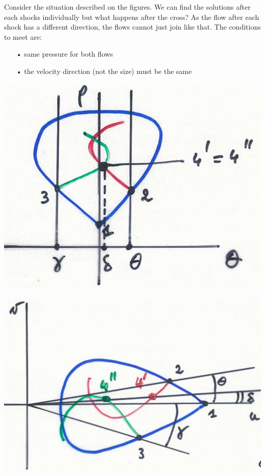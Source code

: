 Consider the situation described on the figures. We can find the solutions after each shocks individually but what happens after the cross? As the flow after each shock has a different direction, the flows cannot just join like that. The conditions to meet are:\\

\begin{itemize}
\item[•] same pressure for both flows
\item[•] the velocity direction (not the size) must be the same\\
\end{itemize}

\begin{center}
\begin{minipage}{0.33\textwidth}
\includegraphics[scale=0.25]{ch9/10}
\end{minipage}
\begin{minipage}{0.35\textwidth}
\includegraphics[scale=0.25]{ch9/11}

\end{minipage}
\end{center}
